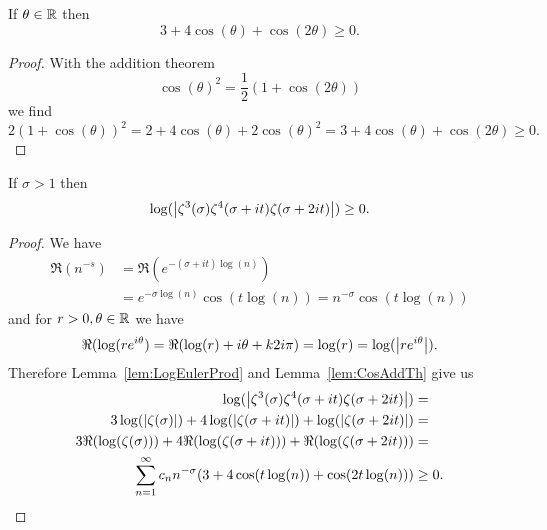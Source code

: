 \begin{lemma}\label{lem:CosAddTh}
	If $\theta \in \mathbb{R}$ then
\begin{equation*}
	3 + 4 \cos(\theta) + \cos(2 \theta) \geq 0.
\end{equation*}
\end{lemma}
\begin{proof}
	With the addition theorem
\begin{equation*}
	\cos(\theta)^2 = \frac{1}{2}(1 + \cos(2 \theta))
\end{equation*}
	we find
\begin{equation*}
	2(1 + \cos(\theta))^2 = 2 + 4 \cos(\theta) + 2 \cos(\theta)^2 = 3 + 4 \cos(\theta) + \cos(2 \theta) \geq 0.
\end{equation*}
\end{proof}


\begin{corollary}\label{cor:LogZeta}
	If $\sigma > 1$ then
\begin{equation*}
	\log(\left|\zeta^3(\sigma) \zeta^4(\sigma + it) \zeta(\sigma + 2it)\right|) \geq 0.
\end{equation*}
\end{corollary}
\begin{proof}
	We have
\begin{equation*}
\begin{aligned}	
	\Re(n^{-s}) 
		&= \Re(e^{-(\sigma + it) \log(n)}) \\
		&= e^{-\sigma \log(n)} \cos(t \log(n)) 
		= n^{-\sigma} \cos(t \log(n))
\end{aligned}
\end{equation*}
	and for $r > 0, \theta \in \mathbb{R}$ we have
\begin{equation*}
	\Re(\log(r e^{i \theta}) = \Re(\log(r) + i\theta + k2i\pi) = \log(r) = \log(\left|r e^{i\theta}\right|).
\end{equation*}
	Therefore Lemma~\ref{lem:LogEulerProd} and Lemma~\ref{lem:CosAddTh} give us
\begin{equation*}
\begin{aligned}
	\log(\left|\zeta^3(\sigma) \zeta^4(\sigma + it) \zeta(\sigma + 2it)\right|) &= \\
	3\log(\left|\zeta(\sigma)\right|) + 4\log(\left|\zeta(\sigma + it)\right|) + \log(\left|\zeta(\sigma + 2it)\right|) &= \\
	3\Re(\log(\zeta(\sigma))) + 4\Re(\log(\zeta(\sigma + it))) + \Re(\log(\zeta(\sigma + 2it))) &= \\
	\sum _{n=1} ^{\infty} c_n n^{-\sigma}(3 + 4\cos(t \log(n)) + \cos(2 t \log(n))) &\geq 0.
\end{aligned}
\end{equation*}
\end{proof}


